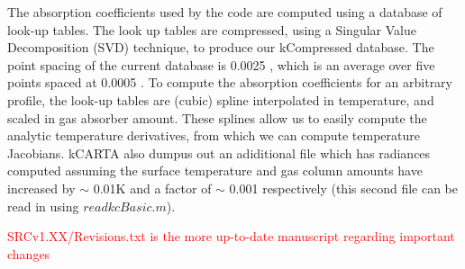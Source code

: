 \documentclass[12pt]{article}
\newcommand{\kc}{\textsf{kCARTA}\xspace}
\begin{document}
The absorption coefficients used by the code are computed using a
database of look-up tables.  The look up tables are compressed, using
a Singular Value Decomposition ({\sf SVD}) technique, to produce our
{\sf kCompressed} database.  The point spacing of the current database is
0.0025 \wn, which is an average over five points spaced at 0.0005
\wn.  To compute the absorption coefficients for an arbitrary
profile, the look-up tables are (cubic) spline interpolated in
temperature, and scaled in gas absorber amount.  These splines allow
us to easily compute the analytic temperature derivatives, from
which we can compute temperature Jacobians. \kc also dumpus out an adiditional
file which has radiances computed assuming the surface temperature and 
gas column amounts have increased by $\sim$ 0.01K and a factor of $\sim$ 0.001 respectively
(this second file can be read in using $readkcBasic.m$).

\textcolor{red}{SRCv1.XX/Revisions.txt is the more up-to-date manuscript regarding important changes}
\end{document}
